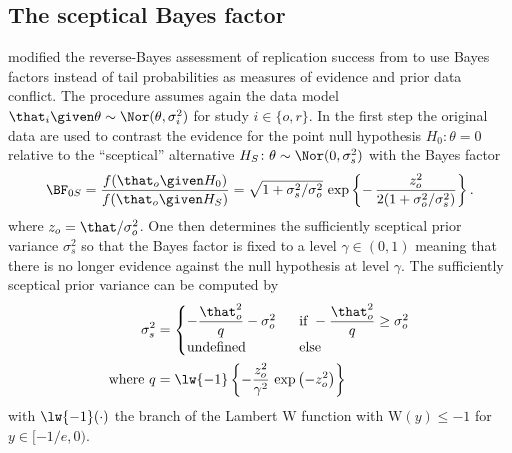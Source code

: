 \begin{subappendices}
\subsection{The sceptical Bayes factor}
\label{sec3sup:BFs}
\citet{Pawel2022b} modified the reverse-Bayes assessment of replication success
from \citet{Held2020} to use Bayes factors \citep{Jeffreys1961, Kass1995}
instead of tail probabilities as measures of evidence and prior data conflict.
The procedure assumes again the data model
$\that_{i} \given \theta \sim \Nor(\theta, \sigma^{2}_{i})$ for study
$i \in \{o, r\}$. In the first step the original data are used to contrast the
evidence for the point null hypothesis $H_{0} \colon \theta = 0$ relative to the
``sceptical'' alternative $H_{S} \colon \theta \sim \Nor(0, \sigma^{2}_{s})$
with the Bayes factor
\begin{align*}
  \BF_{0S}
  = \frac{f(\that_{o} \given H_{0})}{f(\that_{o} \given H_{S})}
  = \sqrt{1 + \sigma^{2}_{s}/\sigma^{2}_{o}} \, \exp\left\{-
  \, \frac{z_{o}^{2}}{2(1 + \sigma^{2}_{o}/\sigma^{2}_{s})}\right\}.
\end{align*}
where $z_{o} = \that/\sigma^{2}_{o}$. One then determines the sufficiently
sceptical prior variance $\sigma^{2}_{s}$ so that the Bayes factor is fixed to a
level $\gamma \in (0, 1)$ meaning that there is no longer evidence against the
null hypothesis at level $\gamma$. The sufficiently sceptical prior variance can
be computed by
\begin{align}
  \label{eq3sup:ssv}
  \sigma^{2}_{s} &=
  \begin{cases}
    -\dfrac{\that_{o}^2}{q} - \sigma^{2}_{o} & ~~ \text{if} ~ -\dfrac{\that_o^2}{q} \geq \sigma^{2}_{o} \\
    \text{undefined} & ~~ \text{else}
  \end{cases} \\
  \text{where} ~ q &= \lw{-1} \left\{-\frac{z_o^2}{\gamma^2} \,
  \exp\left(-z_o^2\right)\right\}
\end{align}
with $\lw{-1}(\cdot)$ the branch of the
Lambert W function with $\text{W}(y) \leq -1$ for $y \in [-1/e, 0)$.


\end{subappendices}
